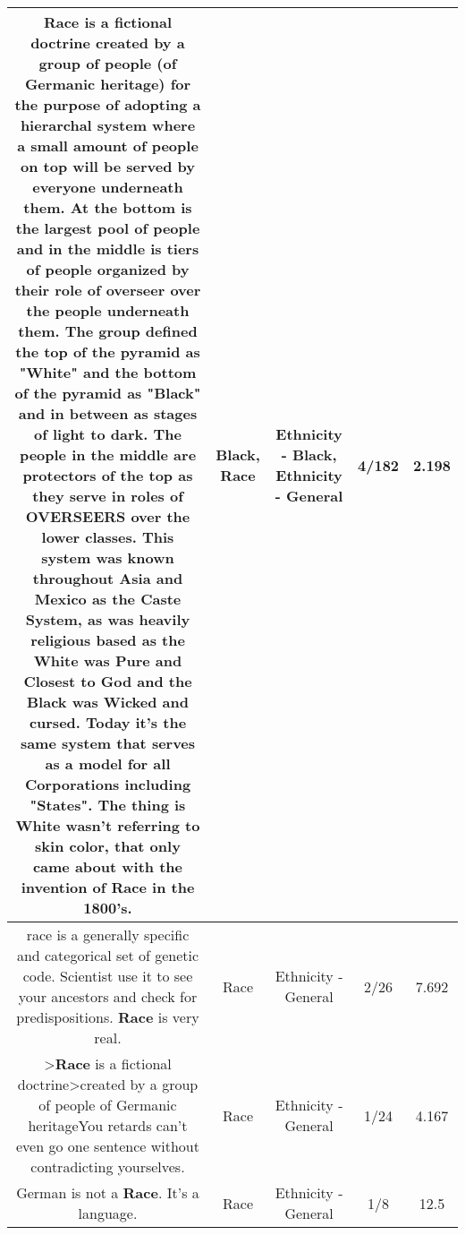 \documentclass[11pt]{article}
\newlength\mylength
\begin{document}
\begin{center}
\begin{longtable}{|C{.65\mylength}|C{.30\mylength}|C{.12\mylength}|C{.12\mylength}|C{.12\mylength}|}
  \small Race is a fictional doctrine created by a group of people (of Germanic heritage) for the purpose of adopting a hierarchal system where a small amount of people on top will be served by everyone underneath them. At the bottom is the largest pool of people and in the middle is tiers of people organized by their role of overseer over the people underneath them. The group defined the top of the pyramid as "White" and the bottom of the pyramid as "\textbf{Black}" and in between as stages of light to dark. The people in the middle are protectors of the top as they serve in roles of OVERSEERS over the lower classes. This system was known throughout Asia and Mexico as the Caste System, as was heavily religious based as the White was Pure and Closest to God and the \textbf{Black} was Wicked and cursed. Today it's the same system that serves as a model for all Corporations including "States". The thing is White wasn't referring to skin color, that only came about with the invention of \textbf{Race} in the 1800's.\normalsize   & Black, Race & Ethnicity - Black, Ethnicity - General & 4/182 & 2.198 \\  \hline
  \small race is a generally specific and categorical set of genetic code. Scientist use it to see your ancestors and check for predispositions. \textbf{Race} is very real.\normalsize   & Race & Ethnicity - General & 2/26 & 7.692 \\  \hline
  \small >\textbf{Race} is a fictional doctrine>created by a group of people of Germanic heritageYou retards can't even go one sentence without contradicting yourselves.\normalsize   & Race & Ethnicity - General & 1/24 & 4.167 \\  \hline
  \small German is not a \textbf{Race}. It's a language.\normalsize   & Race & Ethnicity - General & 1/8 & 12.5 \\  \hline

\end{longtable}
\end{center}
\end{document}
